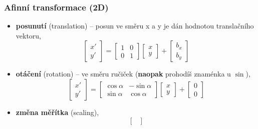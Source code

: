 \subsubsection{Afinní transformace (2D)}
\begin{itemize}
	\item \textbf{posunutí} (translation) -- posun ve směru x a y je dán hodnotou translačního vektoru,
	\begin{equation*}
 \begin{bmatrix}     
 x'   \\[0.3em]      
 y'
 \end{bmatrix} = 
 \begin{bmatrix}
     1 & 0     \\[0.3em]
     0 & 1        
  \end{bmatrix}
  \begin{bmatrix}
     x     \\[0.3em]
     y        
     \end{bmatrix} +
      \begin{bmatrix}
     b_x     \\[0.3em]
     b_y        
     \end{bmatrix}
\end{equation*}
	\item \textbf{otáčení} (rotation) -- ve směru ručiček (\textbf{naopak} prohodíš znaménka u $\sin$),
					\begin{equation*}
				 \begin{bmatrix}     
				 x'   \\[0.3em]      
				 y'
				 \end{bmatrix} = 
				 \begin{bmatrix}
				     \cos{\alpha} & -\sin{\alpha}     \\[0.3em]
				     \sin{\alpha} & \cos{\alpha}        
				  \end{bmatrix}
				  \begin{bmatrix}
				     x     \\[0.3em]
				     y        
				     \end{bmatrix} +
				      \begin{bmatrix}
				     0     \\[0.3em]
				     0        
				     \end{bmatrix}
					\end{equation*}
	\item \textbf{změna měřítka} (scaling),
				\begin{equation*}
			 \begin{bmatrix}     

\end{bmatrix}
\end{equation*}
\end{itemize}
